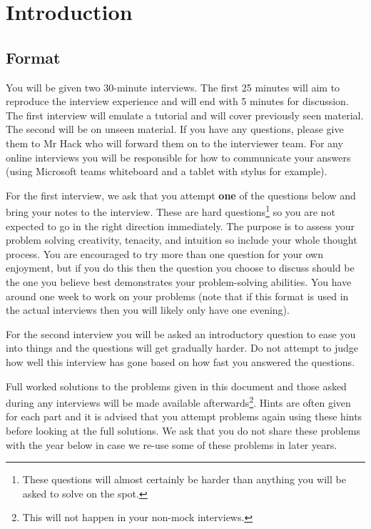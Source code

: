 \section{Introduction}

\subsection{Format}

You will be given two 30-minute interviews. The first 25 minutes will aim to reproduce the interview experience and will end with 5 minutes for discussion. The first interview will emulate a tutorial and will cover previously seen material. The second will be on unseen material. If you have any questions, please give them to Mr Hack who will forward them on to the interviewer team. For any online interviews you will be responsible for how to communicate your answers (using Microsoft teams whiteboard and a tablet with stylus for example).

For the first interview, we ask that you attempt \textbf{one} of the questions below and bring your notes to the interview. These are hard questions\footnote{These questions will almost certainly be harder than anything you will be asked to solve on the spot.} so you are not expected to go in the right direction immediately. The purpose is to assess your problem solving creativity, tenacity, and intuition so include your whole thought process. You are encouraged to try more than one question for your own enjoyment, but if you do this then the question you choose to discuss should be the one you believe best demonstrates your problem-solving abilities. You have around one week to work on your problems (note that if this format is used in the actual interviews then you will likely only have one evening).

For the second interview you will be asked an introductory question to ease you into things and the questions will get gradually harder. Do not attempt to judge how well this interview has gone based on how fast you answered the questions.

Full worked solutions to the problems given in this document and those asked during any interviews will be made available afterwards\footnote{This will not happen in your non-mock interviews.}. Hints are often given for each part and it is advised that you attempt problems again using these hints before looking at the full solutions. We ask that you do not share these problems with the year below in case we re-use some of these problems in later years.

